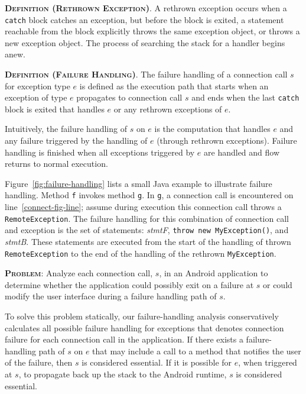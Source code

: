 \begin{description}[leftmargin=0cm,listparindent=0pt,itemindent=0cm]
\item \textsc{\bfseries{Definition (Rethrown Exception)}}.  A
rethrown exception occurs when a \lstinline!catch! block catches an
exception, but before the block is exited, a statement reachable from
the block explicitly throws the same exception object, or throws a new
exception object.  The process of searching the stack for a handler
begins anew.

\item \textsc{\bfseries{Definition (Failure Handling)}}. The
failure handling of a connection call $s$ for exception type $e$ is
defined as the execution path that starts when an exception of type
$e$ propagates to connection call $s$ and ends when the last
\lstinline!catch! block is exited that handles $e$ or any rethrown
exceptions of $e$.
\end{description}

Intuitively, the failure handling of $s$ on $e$ is the computation
that handles $e$ and any failure triggered by the handling of $e$
(through rethrown exceptions).  Failure handling is finished when all
exceptions triggered by $e$ are handled and flow returns to normal
execution.  

Figure~\ref{fig:failure-handling} lists a small Java example to
illustrate failure handling.  Method \lstinline!f! invokes method
\lstinline!g!.  In \lstinline!g!, a connection call is encountered on
line~\ref{connect-fig-line}; assume during execution this connection call
throws a \lstinline!RemoteException!.  The failure handling for this
combination of connection call and exception is the set of statements:
{\it stmtF}, \lstinline!throw new MyException()!, and {\it stmtB}.
These statements are executed from the start of the handling of thrown
\lstinline!RemoteException! to the end of the handling of the rethrown
\lstinline!MyException!.

\begin{description}[leftmargin=0cm,listparindent=0pt,itemindent=0cm]
\item \textsc{\bfseries{Problem}}: Analyze each connection call,
$s$, in an Android application to determine whether the application
could possibly exit on a failure at $s$ or could modify the user
interface during a failure handling path of $s$.
\end{description}

To solve this problem statically, our failure-handling analysis
conservatively calculates all possible failure handling for exceptions
that denotes connection failure for each connection call in the
application.  If there exists a failure-handling path of $s$ on $e$
that may include a call to a method that notifies the user of the
failure, then $s$ is considered essential.  If it is possible for $e$,
when triggered at $s$, to propagate back up the stack to the Android
runtime, $s$ is considered essential.

